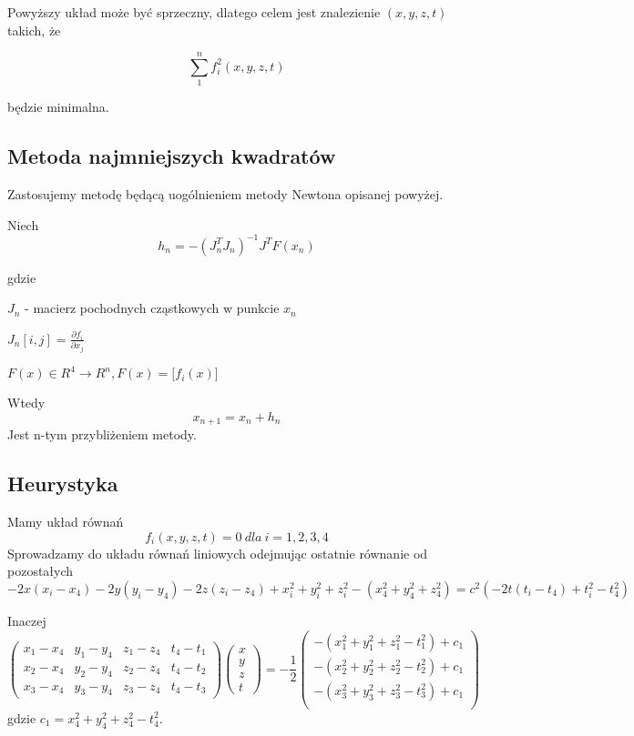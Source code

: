 \documentclass{article}
\begin{document}
Powyższy układ może być sprzeczny, dlatego celem jest znalezienie $ (x, y, z, t) $ takich, że

$$\sum_{1}^{n} f_{i}^2(x, y, z, t) $$

będzie minimalna.

\subsection{Metoda najmniejszych kwadratów}
Zastosujemy metodę będącą uogólnieniem metody Newtona opisanej powyżej. \newline

Niech
$$ h_{n} = -(J_{n}^T J_{n})^{-1} J^T F(x_{n})$$

gdzie \newline

$J_{n}$ - macierz pochodnych cząstkowych w punkcie $x_n$ \newline

$J_{n}[i, j] = \frac{\partial f_i}{\partial x_j} $ \newline

$F(x) \in R^4 \to R^n , F(x) = \big[f_{i}(x)\big]$ \newline

Wtedy
$$ x_{n+1} = x_{n} + h_{n} $$
Jest n-tym przybliżeniem metody.

\subsection{Heurystyka}
Mamy układ równań
$$ f_{i}(x, y, z, t) =0 \ dla \ i = 1,2,3,4$$
Sprowadzamy do układu równań liniowych odejmując ostatnie równanie od pozostałych
$$-2x(x_i-x_4) -2y(y_i-y_4) -2z(z_i-z_4) + x_i^2 + y_i^2 + z_i^2 - (x_4^2 + y_4^2 + z_4^2) = c^2(-2t(t_i-t_4)+t_i^2-t_4^2)$$

Inaczej
$$
\begin{pmatrix}
x_1-x_4 & y_1-y_4 & z_1-z_4 & t_4-t_1 \\
x_2-x_4 & y_2-y_4 & z_2-z_4 & t_4-t_2 \\
x_3-x_4 & y_3-y_4 & z_3-z_4 & t_4-t_3
\end{pmatrix}
\begin{pmatrix}
x \\ y \\ z \\ t
\end{pmatrix}
=
-\frac{1}{2}
\begin{pmatrix}
-(x_1^2+y_1^2+z_1^2-t_1^2)+c_1 \\
-(x_2^2+y_2^2+z_2^2-t_2^2)+c_1 \\
-(x_3^2+y_3^2+z_3^2-t_3^2)+c_1 \\
\end{pmatrix}
$$
gdzie $c_1=x_4^2+y_4^2+z_4^2-t_4^2$.
\end{document}
